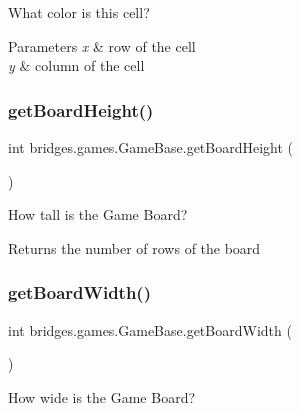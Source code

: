 What color is this cell? 


\begin{DoxyParams}{Parameters}
{\em x} & row of the cell \\
\hline
{\em y} & column of the cell \\
\hline
\end{DoxyParams}
\mbox{\label{classbridges_1_1games_1_1_game_base_a1effb2a789eb19eb81dec64f25be233e}} 
\subsubsection{\texorpdfstring{get\+Board\+Height()}{getBoardHeight()}}
{\footnotesize\ttfamily int bridges.\+games.\+Game\+Base.\+get\+Board\+Height (\begin{DoxyParamCaption}{ }\end{DoxyParamCaption})\hspace{0.3cm}{\ttfamily [protected]}}



How tall is the Game Board? 

\begin{DoxyReturn}{Returns}
the number of rows of the board 
\end{DoxyReturn}
\mbox{\label{classbridges_1_1games_1_1_game_base_a33018840a6f19eb54ef27e55231871f5}} 
\subsubsection{\texorpdfstring{get\+Board\+Width()}{getBoardWidth()}}
{\footnotesize\ttfamily int bridges.\+games.\+Game\+Base.\+get\+Board\+Width (\begin{DoxyParamCaption}{ }\end{DoxyParamCaption})\hspace{0.3cm}{\ttfamily [protected]}}



How wide is the Game Board? 

